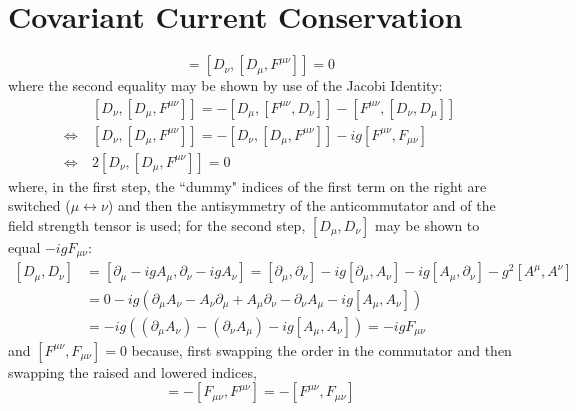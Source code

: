 \section{Covariant Current Conservation}
\label{ap:covariant_conservation}

\begin{equation}
	[D_\nu, J^\nu] = [D_\nu, [D_\mu, F^{\mu \nu}]] = 0
\end{equation}
where the second equality may be shown by use of the Jacobi Identity:
\begin{equation}
	\begin{split}
		& [D_\nu, [D_\mu, F^{\mu \nu}]] = - [D_\mu, [F^{\mu \nu}, D_\nu]] - [F^{\mu \nu}, [D_\nu, D_\mu]] \\
		\Leftrightarrow ~ & [D_\nu, [D_\mu, F^{\mu \nu}]] = - [D_\nu, [D_\mu, F^{\mu \nu}]] - ig [F^{\mu \nu}, F_{\mu \nu}]
		\\
		\Leftrightarrow ~ & 2 [D_\nu, [D_\mu, F^{\mu \nu}]] = 0
	\end{split}
\end{equation}
where, in the first step, the ``dummy" indices of the first term on the right are switched ($\mu 	\leftrightarrow \nu$) and then the antisymmetry of the anticommutator and of the field strength tensor is used; for the second step, $[D_\mu, D_\nu]$ may be shown to equal $-ig F_{\mu \nu}$:
\begin{equation}
	\begin{split}
		[D_\mu, D_\nu] & = [\partial_\mu - i g A_\mu, \partial_\nu - i g A_\nu] = [\partial_\mu, \partial_\nu] - ig [\partial_\mu, A_\nu] - i g [A_\mu, \partial_\nu] - g^2 [A^\mu, A^\nu] \\
		& =  0 - ig \left( \partial_\mu A_\nu -  A_\nu \partial_\mu + A_\mu \partial_\nu  - \partial_\nu A_\mu - ig [A_\mu, A_\nu] \right) \\
		& = -ig \left( (\partial_\mu A_\nu) - (\partial_\nu A_\mu) - ig [A_\mu, A_\nu] \right) = -ig F_{\mu\nu}
	\end{split}
\end{equation}
and $[F^{\mu\nu}, F_{\mu\nu}] = 0$ because, first swapping the order in the commutator and then swapping the raised and lowered indices,
\begin{equation}
	[F^{\mu\nu}, F_{\mu\nu}] = -[F_{\mu\nu}, F^{\mu\nu}] = - [F^{\mu\nu}, F_{\mu\nu}]
\end{equation}
